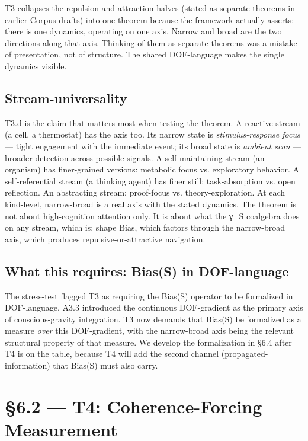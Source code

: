 \documentclass[11pt, openany]{book}
\newcommand{\sectionbreak}{\clearpage}
\begin{document}
T3 collapses the repulsion and attraction halves (stated as separate theorems in earlier Corpus drafts) into one theorem because the framework actually asserts: there is one dynamics, operating on one axis. Narrow and broad are the two directions along that axis. Thinking of them as separate theorems was a mistake of presentation, not of structure. The shared DOF-language makes the single dynamics visible.

\subsection{Stream-universality}

T3.d is the claim that matters most when testing the theorem. A reactive stream (a cell, a thermostat) has the axis too. Its narrow state is \textit{stimulus-response focus} --- tight engagement with the immediate event; its broad state is \textit{ambient scan} --- broader detection across possible signals. A self-maintaining stream (an organism) has finer-grained versions: metabolic focus vs. exploratory behavior. A self-referential stream (a thinking agent) has finer still: task-absorption vs. open reflection. An abstracting stream: proof-focus vs. theory-exploration. At each kind-level, narrow-broad is a real axis with the stated dynamics. The theorem is not about high-cognition attention only. It is about what the γ\_\allowbreak{}S coalgebra does on any stream, which is: shape Bias, which factors through the narrow-broad axis, which produces repulsive-or-attractive navigation.

\subsection{What this requires: Bias(S) in DOF-language}

The stress-test flagged T3 as requiring the Bias(S) operator to be formalized in DOF-language. A3.3 introduced the continuous DOF-gradient as the primary axis of conscious-gravity integration. T3 now demands that Bias(S) be formalized as a measure \textit{over} this DOF-gradient, with the narrow-broad axis being the relevant structural property of that measure. We develop the formalization in §6.4 after T4 is on the table, because T4 will add the second channel (propagated-information) that Bias(S) must also carry.

\sectionbreak

\section{§6.2 --- T4: Coherence-Forcing Measurement}
\end{document}
